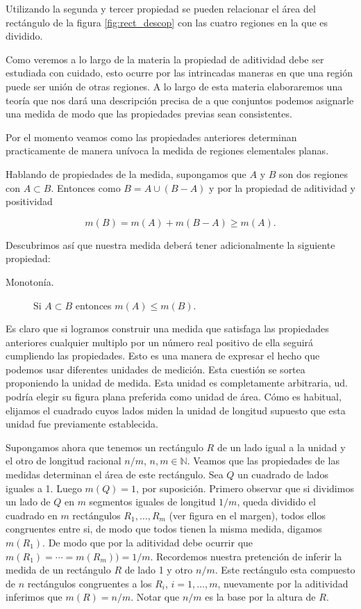 Utilizando la segunda y tercer propiedad se pueden relacionar el área del rectángulo de la figura \ref{fig:rect_descop} con las cuatro regiones en la que es dividido.

Como veremos a lo largo de la materia la propiedad de aditividad debe ser estudiada con cuidado, esto ocurre por las intrincadas maneras en que una región puede ser unión de otras regiones. A lo largo de esta materia elaboraremos una  teoría que nos dará una descripción  precisa de a que conjuntos podemos asignarle una medida de modo que las propiedades previas sean consistentes. 

Por el momento veamos como las propiedades anteriores determinan practicamente de manera unívoca la medida de regiones elementales planas.  


Hablando de propiedades de la medida, supongamos que $A$ y $B$ son dos regiones con $A\subset B$. Entonces como $B=A\cup (B-A)$ y por la propiedad de aditividad y positividad

\[
 m(B)=m(A)+m(B-A)\geq m(A).
\]

Descubrimos así que nuestra medida deberá tener adicionalmente la siguiente propiedad:
\begin{description}
 \item[Monotonía.] Si $A\subset B$ entonces $m(A)\leq m(B)$. 
\end{description}
Es claro que si logramos construir una medida que satisfaga las propiedades anteriores cualquier multiplo por un número real positivo  de ella seguirá cumpliendo las propiedades. Esto es una manera de expresar el hecho que podemos usar diferentes unidades de medición. Esta cuestión se sortea proponiendo la unidad de medida. Esta unidad es completamente arbitraria, ud. podría elegir su figura plana preferida como unidad de área.   Cómo es habitual, elijamos el cuadrado cuyos lados miden la unidad de longitud supuesto que esta unidad fue previamente establecida. 


Supongamos ahora que tenemos un rectángulo $R$ de un lado igual a la unidad y el otro de longitud racional $n/m$, $n,m\in\mathbb{N}$. Veamos que las propiedades de las medidas determinan el área de este rectángulo. Sea $Q$ un cuadrado de lados iguales a 1. Luego $m(Q)=1$, por suposición.  Primero observar que si dividimos un lado de $Q$ en $m$ segmentos iguales de longitud $1/m$, queda dividido el cuadrado en $m$ rectángulos $R_1,\ldots,R_m$ (ver figura en el margen), todos ellos  congruentes entre si, de modo que todos tienen la misma medida, digamos $m(R_1)$.  De modo que por la aditividad debe ocurrir que $m(R_1)=\cdots =m(R_m))=1/m$. Recordemos nuestra pretención de inferir la medida de un rectángulo $R$ de lado 1 y otro $n/m$. Este rectángulo esta compuesto de $n$ rectángulos congruentes a los $R_i$, $i=1,\ldots,m$, nuevamente por la aditividad inferimos que $m(R)=n/m$. Notar que $n/m$ es la base por la altura de $R$.

